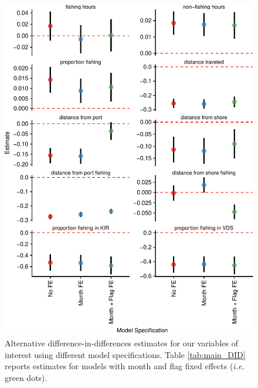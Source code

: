 \documentclass[9p,twocolumn,twoside,lineno]{pnas-new}
\begin{document}
\begin{figure}
\centering
\includegraphics{img/other_specifications.pdf}
\caption{\label{fig:other_specifications}Alternative difference-in-differences estimates
for our variables of interest using different model specifications. Table \ref{tab:main_DID}
reports estimates for models with month and flag fixed effects (\emph{i.e.} green dots).}
\end{figure}
\end{document}

